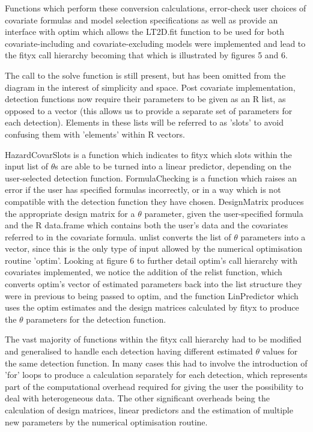 \documentclass[11pt]{article}
\begin{document}
\begin{multicols}{2}
Functions which perform these conversion calculations, error-check user choices of covariate formulas and model selection specifications as well as provide an interface with optim which allows the LT2D.fit function to be used for both covariate-including and covariate-excluding models were implemented and lead to the fityx call hierarchy becoming that which is illustrated by figures 5 and 6. 

The call to the solve function is still present, but has been omitted from the diagram in the interest of simplicity and space. Post covariate implementation, detection functions now require their parameters to be given as an R list, as opposed to a vector (this allows us to provide a separate set of parameters for each detection). Elements in these lists will be referred to as 'slots' to avoid confusing them with 'elements' within R vectors. 

HazardCovarSlots is a function which indicates to fityx which slots within the input list of $\theta$s are able to be turned into a linear predictor, depending on the user-selected detection function. FormulaChecking is a function which raises an error if the user has specified formulas incorrectly, or in a way which is not compatible with the detection function they have chosen. DesignMatrix produces the appropriate design matrix for a $\theta$  parameter, given the user-specified formula and the R data.frame which contains both the user's data and the covariates referred to in the covariate formula. unlist converts the list of $\theta$ parameters into a vector, since this is the only type of input allowed by the numerical optimisation routine 'optim'. Looking at figure 6 to further detail optim's call hierarchy with covariates implemented, we notice the addition of the relist function, which converts optim's vector of estimated parameters back into the list structure they were in previous to being passed to optim, and the function LinPredictor which uses the optim estimates and the design matrices calculated by fityx to produce the $\theta$ parameters for the detection function.

The vast majority of functions within the fityx call hierarchy had to be modified and generalised to handle each detection having different estimated $\theta$ values for the same detection function. In many cases this had to involve the introduction of 'for' loops to produce a calculation separately for each detection, which represents part of the computational overhead required for giving the user the possibility to deal with  heterogeneous data. The other significant overheads being the calculation of design matrices, linear predictors and the estimation of multiple new parameters by the numerical optimisation routine.  


\end{multicols}
\end{document}
